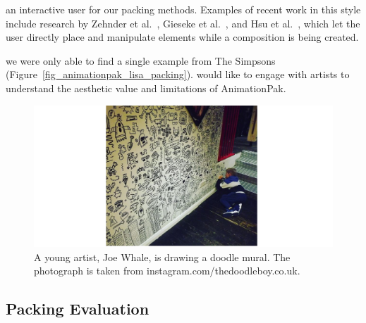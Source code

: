  an interactive user  for our packing methods.
Examples of recent work in this style include research
by Zehnder et al.~\cite{Zehnder2016}, Gieseke et al.~\cite{Gieseke2017}, 
and Hsu et al.~\cite{Hsu2020}, which let the user directly place and manipulate
elements while a composition is being created.

we were only able to find a single example from The Simpsons (Figure~\ref{fig_animationpak_lisa_packing}). 
 would like to engage with artists to understand the aesthetic value and limitations
of AnimationPak.

\begin{figure}
\centering
\includegraphics[width=1.0\textwidth]{figures/conclusions/doodle_boy.pdf}
\caption[A doodle mural by Joe Whale]
{ \label{doodle_boy} 
\nnewtext
{
A young artist, Joe Whale, is drawing a doodle mural. 
The photograph is taken from instagram.com/thedoodleboy.co.uk.
}
}
\end{figure}

\subsection{Packing Evaluation}

